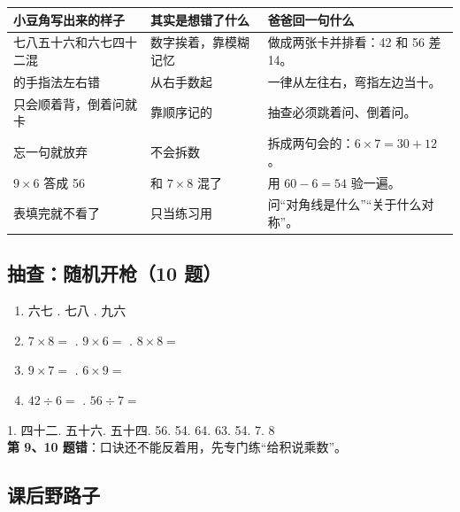 \begin{center}
\small
\begin{tabularx}{\linewidth}{@{}p{3.8cm}p{4.0cm}X@{}}
\toprule
\textbf{小豆角写出来的样子} & \textbf{其实是想错了什么} & \textbf{爸爸回一句什么} \\
\midrule
七八五十六和六七四十二混 & 数字挨着，靠模糊记忆 & 做成两张卡并排看：42 和 56 差 14。\\
\addlinespace[2pt]
9 的手指法左右错 & 从右手数起 & 一律从左往右，弯指左边当十。\\
\addlinespace[2pt]
只会顺着背，倒着问就卡 & 靠顺序记的 & 抽查必须跳着问、倒着问。\\
\addlinespace[2pt]
忘一句就放弃 & 不会拆数 & 拆成两句会的：$6\times7=30+12$。\\
\addlinespace[2pt]
$9\times6$ 答成 56 & 和 $7\times8$ 混了 & 用 $60-6=54$ 验一遍。\\
\addlinespace[2pt]
表填完就不看了 & 只当练习用 & 问“对角线是什么”“关于什么对称”。\\
\bottomrule
\end{tabularx}
\end{center}

\subsection{抽查：随机开枪（10 题）}

\begin{enumerate}[label=\arabic*.,itemsep=4pt]
  \item 六七 \blank[1.6cm] . 七八 \blank[1.6cm] . 九六 \blank[1.6cm]
  \item $7\times8=$ \blank[1.4cm] . $9\times6=$ \blank[1.4cm] . $8\times8=$ \blank[1.4cm]
  \item $9\times7=$ \blank[1.4cm] . $6\times9=$ \blank[1.4cm]
  \item $42\div6=$ \blank[1.4cm] . $56\div7=$ \blank[1.4cm]
\end{enumerate}

\begin{ansbox}
1. 四十二. 五十六. 五十四. 56. 54. 64. 63. 54. 7. 8 \\
\textbf{第 9、10 题错}：口诀还不能反着用，先专门练“给积说乘数”。
\end{ansbox}

\subsection{课后野路子}

